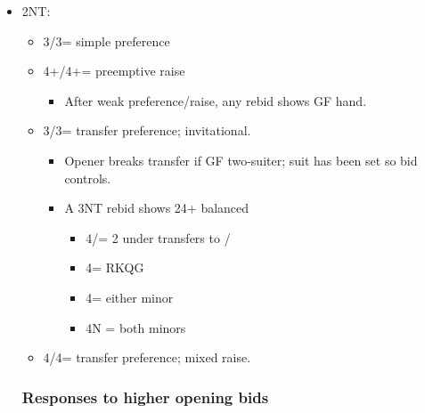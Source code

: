 \documentclass[a4paper,14pt]{extarticle}
\begin{document}
\begin{itemize}
\item 2NT:
	\begin{itemize}
   \item 3\diamonds/3\spades = simple preference
   \item 4+\diamonds/4+\spades = preemptive raise
		\begin{itemize}
      \item After weak preference/raise, any rebid shows GF hand.
		\end{itemize}
   \item 3\clubs/3\hearts = transfer preference; invitational.
		\begin{itemize}
      \item Opener breaks transfer if GF two-suiter; suit has been set so bid controls.
      \item A 3NT rebid shows 24+ balanced
			\begin{itemize}
         \item 4\clubs/\diamonds = 2 under transfers to \hearts/\spades
         \item 4\hearts = RKQG
			\item 4\spades = either minor
         \item 4N = both minors
			\end{itemize}
		\end{itemize}
   \item 4\clubs/4\hearts = transfer preference; mixed raise.
	\end{itemize}

\newpage

\subsubsection{Responses to higher opening bids}
\label{sec:resp:higher}


\end{itemize}
\end{document}
